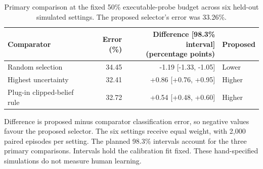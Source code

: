 \begin{table}[t]
\centering
\caption{Primary comparison at the fixed 50\% executable-probe budget across six held-out simulated settings. The proposed selector's error was 33.26\%.}
\label{tab:m7b-primary-comparison}
\begin{tabular}{@{}lrrl@{}}
\toprule
Comparator & Error (\%) & \shortstack{Difference [98.3\% interval]\\(percentage points)} & Proposed \\
\midrule
Random selection & 34.45 & -1.19 [-1.33, -1.05] & Lower \\
Highest uncertainty & 32.41 & +0.86 [+0.76, +0.95] & Higher \\
Plug-in clipped-belief rule & 32.72 & +0.54 [+0.48, +0.60] & Higher \\
\bottomrule
\end{tabular}
\vspace{0.4em}
\begin{minipage}{0.98\linewidth}
\footnotesize Difference is proposed minus comparator classification error, so negative values favour the proposed selector. The six settings receive equal weight, with 2,000 paired episodes per setting. The planned 98.3\% intervals account for the three primary comparisons. Intervals hold the calibration fit fixed. These hand-specified simulations do not measure human learning.
\end{minipage}
\end{table}
